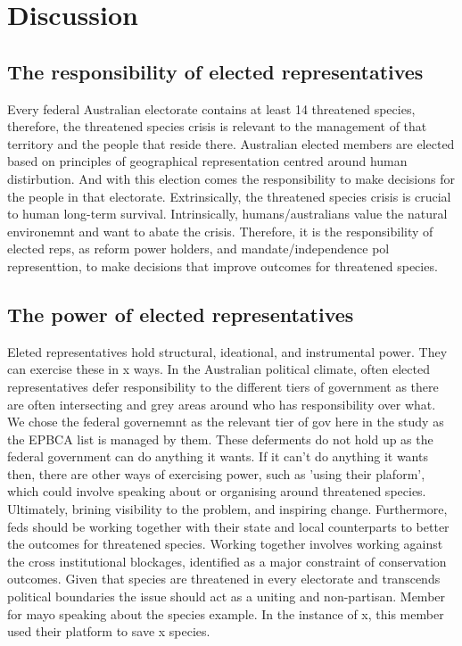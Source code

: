 \documentclass[a4paper,11pt]{article}
\begin{document}
\section{Discussion}

\subsection{The responsibility of elected representatives}

Every federal Australian electorate contains at least 14 threatened species, therefore, the threatened species crisis is relevant to the management of that territory and the people that reside there. Australian elected members are elected based on principles of geographical representation centred around human distirbution. And with this election comes the responsibility to make decisions for the people in that electorate. Extrinsically, the threatened species crisis is crucial to human long-term survival. Intrinsically, humans/australians value the natural environemnt and want to abate the crisis. Therefore, it is the responsibility of elected reps, as reform power holders, and mandate/independence pol representtion, to make decisions that improve outcomes for threatened species.

\subsection{The power of elected representatives}

Eleted representatives hold structural, ideational, and instrumental power. They can exercise these in x ways.
In the Australian political climate, often elected representatives defer responsibility to the different tiers of government as there are often intersecting and grey areas around who has responsibility over what. We chose the federal governemnt as the relevant tier of gov here in the study as the EPBCA list is managed by them. These deferments do not hold up as the federal government can do anything it wants. If it can't do anything it wants then, there are other ways of exercising power, such as 'using their plaform', which could involve speaking about or organising around threatened species. Ultimately, brining visibility to the problem, and inspiring change.
Furthermore, feds should be working together with their state and local counterparts to better the outcomes for threatened species. Working together involves working against the cross institutional blockages, identified as a major constraint of conservation outcomes.
Given that species are threatened in every electorate and transcends political boundaries the issue should act as a uniting and non-partisan.
Member for mayo speaking about the species example.
In the instance of x, this member used their platform to save x species.
\end{document}
